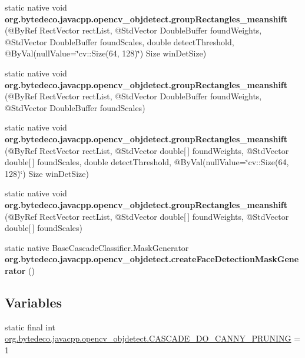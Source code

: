 \begin{DoxyCompactItemize}
\item 
\mbox{\label{group__objdetect_ga9d5a08468e306e8b6488b1a1ecd42dbc}} 
static native void {\bfseries org.\+bytedeco.\+javacpp.\+opencv\+\_\+objdetect.\+group\+Rectangles\+\_\+meanshift} (@By\+Ref Rect\+Vector rect\+List, @Std\+Vector Double\+Buffer found\+Weights, @Std\+Vector Double\+Buffer found\+Scales, double detect\+Threshold, @By\+Val(null\+Value=\char`\"{}cv\+::\+Size(64, 128)\char`\"{}) Size win\+Det\+Size)
\item 
\mbox{\label{group__objdetect_ga8b6847c88823092cc641a37431d2c19a}} 
static native void {\bfseries org.\+bytedeco.\+javacpp.\+opencv\+\_\+objdetect.\+group\+Rectangles\+\_\+meanshift} (@By\+Ref Rect\+Vector rect\+List, @Std\+Vector Double\+Buffer found\+Weights, @Std\+Vector Double\+Buffer found\+Scales)
\item 
\mbox{\label{group__objdetect_gafc1748f394c9d4ffba933d43dac81831}} 
static native void {\bfseries org.\+bytedeco.\+javacpp.\+opencv\+\_\+objdetect.\+group\+Rectangles\+\_\+meanshift} (@By\+Ref Rect\+Vector rect\+List, @Std\+Vector double\mbox{[}$\,$\mbox{]} found\+Weights, @Std\+Vector double\mbox{[}$\,$\mbox{]} found\+Scales, double detect\+Threshold, @By\+Val(null\+Value=\char`\"{}cv\+::\+Size(64, 128)\char`\"{}) Size win\+Det\+Size)
\item 
\mbox{\label{group__objdetect_ga54d82b7d732ccfd57187e46084edda14}} 
static native void {\bfseries org.\+bytedeco.\+javacpp.\+opencv\+\_\+objdetect.\+group\+Rectangles\+\_\+meanshift} (@By\+Ref Rect\+Vector rect\+List, @Std\+Vector double\mbox{[}$\,$\mbox{]} found\+Weights, @Std\+Vector double\mbox{[}$\,$\mbox{]} found\+Scales)
\item 
\mbox{\label{group__objdetect_ga3c175bcfe577e6b8b31619b46d266ea4}} 
static native Base\+Cascade\+Classifier.\+Mask\+Generator {\bfseries org.\+bytedeco.\+javacpp.\+opencv\+\_\+objdetect.\+create\+Face\+Detection\+Mask\+Generator} ()
\end{DoxyCompactItemize}
\subsection*{Variables}
\begin{DoxyCompactItemize}
\item 
static final int \hyperlink{group__objdetect_ga470401e5de188ad94a16d0026658f405}{org.\+bytedeco.\+javacpp.\+opencv\+\_\+objdetect.\+C\+A\+S\+C\+A\+D\+E\+\_\+\+D\+O\+\_\+\+C\+A\+N\+N\+Y\+\_\+\+P\+R\+U\+N\+I\+NG} = 1
\end{DoxyCompactItemize}


